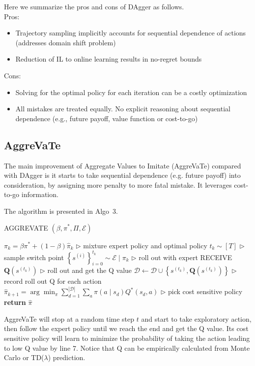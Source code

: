 \documentclass[11pt]{article}
\begin{document}
Here we summarize the pros and cons of DAgger as follows.\\
Pros:
\begin{itemize}
    \item Trajectory sampling implicitly accounts for sequential dependence of actions (addresses domain shift problem)
    \item Reduction of IL to online learning results in no-regret bounds
\end{itemize}
Cons:
\begin{itemize}
    \item Solving for the optimal policy for each iteration can be a costly optimization
    \item All mistakes are treated equally. No explicit reasoning about sequential dependence (e.g., future payoff, value function or cost-to-go)
\end{itemize}

\subsection{AggreVaTe}
The main improvement of Aggregate Values to Imitate (AggreVaTe\cite{ross2014reinforcement}) compared with DAgger is it starts to take sequential dependence (e.g. future payoff) into consideration, by assigning more penalty to more fatal mistake. It leverages cost-to-go information.

The algorithm is presented in Algo~3.
\begin{algorithm}[H]
\caption{AGGREVATE $\left(\beta, \pi^{*}, \Pi, \mathcal{E}\right)$}
\begin{algorithmic}[1]
\STATE $\pi_{k}=\beta \pi^{*}+(1-\beta) \hat{\pi}_{k}$ \hfill $\triangleright$ mixture expert policy and optimal policy
\STATE  $t_{k} \sim[T] $ \hfill$\triangleright$ sample switch point
\STATE  $\left\{s^{(i)}\right\}_{i=0}^{t_{k}} \sim \mathcal{E} \mid \pi_{k}$ \hfill $\triangleright$ roll out with expert
\STATE   RECEIVE $\boldsymbol{Q}\left(s^{\left(t_{k}\right)}\right)$ \hfill $\triangleright$ roll out and get the Q value
\STATE  $\mathcal{D} \leftarrow \mathcal{D} \cup\left\{s^{\left(t_{k}\right)}, \boldsymbol{Q}\left(s^{\left(t_{k}\right)}\right)\right\}$ \hfill $\triangleright$ record roll out Q for each action
\STATE  $\hat{\pi}_{k+1}=\arg \min _{\pi} \sum_{d=1}^{|\mathcal{D}|} \sum_{a} \pi\left(a \mid s_{d}\right) Q^{*}\left(s_{d}, a\right)$ \hfill $\triangleright$ pick cost sensitive policy
\ENDFOR
\STATE \textbf{return} $\hat{\pi}$
\label{algo:aggrevate}
\end{algorithmic}
\end{algorithm}
AggreVaTe will stop at a random time step $t$ and start to take exploratory action, then follow the expert policy until we reach the end and get the Q value. Its cost sensitive policy will learn to minimize the probability of taking the action leading to low Q value by line 7. Notice that Q can be empirically calculated from Monte Carlo or TD($\lambda$) prediction.
\end{document}
